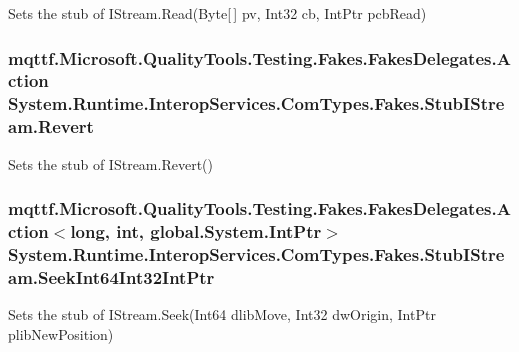Sets the stub of I\-Stream.\-Read(\-Byte\mbox{[}$\,$\mbox{]} pv, Int32 cb, Int\-Ptr pcb\-Read)

\hypertarget{class_system_1_1_runtime_1_1_interop_services_1_1_com_types_1_1_fakes_1_1_stub_i_stream_a4b5e86216333227680d0744b010f0306}{
\subsubsection[{Revert}]{\setlength{\rightskip}{0pt plus 5cm}mqttf.\-Microsoft.\-Quality\-Tools.\-Testing.\-Fakes.\-Fakes\-Delegates.\-Action System.\-Runtime.\-Interop\-Services.\-Com\-Types.\-Fakes.\-Stub\-I\-Stream.\-Revert}}\label{class_system_1_1_runtime_1_1_interop_services_1_1_com_types_1_1_fakes_1_1_stub_i_stream_a4b5e86216333227680d0744b010f0306}


Sets the stub of I\-Stream.\-Revert()

\hypertarget{class_system_1_1_runtime_1_1_interop_services_1_1_com_types_1_1_fakes_1_1_stub_i_stream_ab29c4e1e0ce905f9d140f3c13887a35b}{
\subsubsection[{Seek\-Int64\-Int32\-Int\-Ptr}]{\setlength{\rightskip}{0pt plus 5cm}mqttf.\-Microsoft.\-Quality\-Tools.\-Testing.\-Fakes.\-Fakes\-Delegates.\-Action$<$long, int, global.\-System.\-Int\-Ptr$>$ System.\-Runtime.\-Interop\-Services.\-Com\-Types.\-Fakes.\-Stub\-I\-Stream.\-Seek\-Int64\-Int32\-Int\-Ptr}}\label{class_system_1_1_runtime_1_1_interop_services_1_1_com_types_1_1_fakes_1_1_stub_i_stream_ab29c4e1e0ce905f9d140f3c13887a35b}


Sets the stub of I\-Stream.\-Seek(\-Int64 dlib\-Move, Int32 dw\-Origin, Int\-Ptr plib\-New\-Position)

